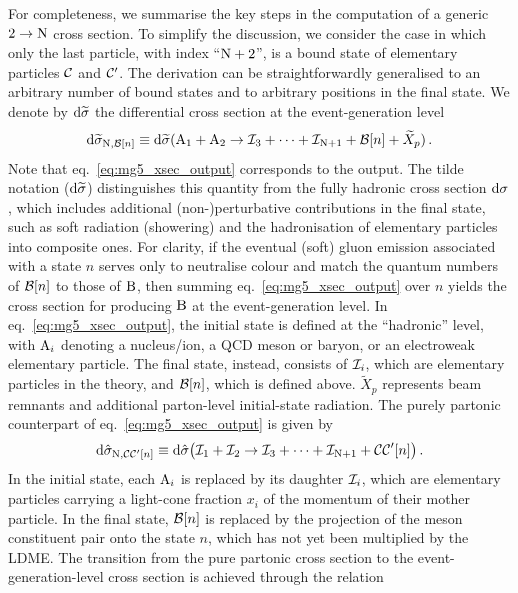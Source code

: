 For completeness, we summarise the key steps in the computation of a generic $2 \to {\rm N}$ cross section. 
To simplify the discussion, we consider the case in which only the last particle, with index “${\rm N}+2$”, is a bound state of elementary particles ${\cal C}$ and ${\cal C}^\prime$. The derivation can be straightforwardly generalised to an arbitrary number of bound states and to arbitrary positions in the final state.
We denote by $\mathrm{d} \widetilde \sigma$ the differential cross section at the event-generation level
\begin{equation}
    \mathrm{d} \widetilde \sigma_{{\rm N},{\cal B}[n]} \equiv \mathrm{d}\widetilde{\sigma}( {\rm A}_1 + {\rm A}_2 \rightarrow {\cal I}_3 + \dots + {\cal I}_{{\rm N}+1} + {\cal B}[n] + \widetilde{X}_p)\,.
\label{eq:mg5_xsec_output}
\end{equation}
Note that eq.~\eqref{eq:mg5_xsec_output} corresponds to the {\mgshort} output. 
The tilde notation ($\mathrm{d} \widetilde \sigma$) distinguishes this quantity from the fully hadronic cross section $\mathrm{d} \sigma$, which includes additional (non-)perturbative contributions in the final state, such as soft radiation (showering) and the hadronisation of elementary particles into composite ones.
For clarity, if the eventual (soft) gluon emission associated with a state $n$ serves only to neutralise colour and match the quantum numbers of ${\cal B}[n]$ to those of ${\rm B}$, then summing eq.~\eqref{eq:mg5_xsec_output} over $n$ yields the cross section for producing ${\rm B}$ at the event-generation level.
In eq.~\eqref{eq:mg5_xsec_output}, the initial state is defined at the “hadronic” level, with ${\rm A}_i$ denoting a nucleus/ion, a QCD meson or baryon, or an electroweak elementary particle.
The final state, instead, consists of ${\cal I}_i$, which are elementary particles in the theory, and ${\cal B}[n]$, which is defined above.
$\widetilde{X}_p$ represents beam remnants and additional parton-level initial-state radiation. 
The purely partonic counterpart of eq.~\eqref{eq:mg5_xsec_output} is given by
\begin{equation}
    \mathrm{d} \hat \sigma_{{\rm N},{{\cal C C}^\prime}[n]} \equiv \mathrm{d}\hat{\sigma}\big( {\cal I}_1 + {\cal I}_2 \rightarrow {\cal I}_3 + \dots + {\cal I}_{{\rm N}+1} + {{\cal C C}^\prime}[n]\big)\,.
\label{eq:partonic_xsec}
\end{equation}
In the initial state, each ${\rm A}_i$ is replaced by its daughter ${\cal I}_i$, which are elementary particles carrying a light-cone fraction $x_i$ of the momentum of their mother particle.
In the final state, ${\cal B}[n]$ is replaced by the projection of the meson constituent pair onto the state $n$, which has not yet been multiplied by the LDME. The transition from the pure partonic cross section to the event-generation-level cross section is achieved through the relation
